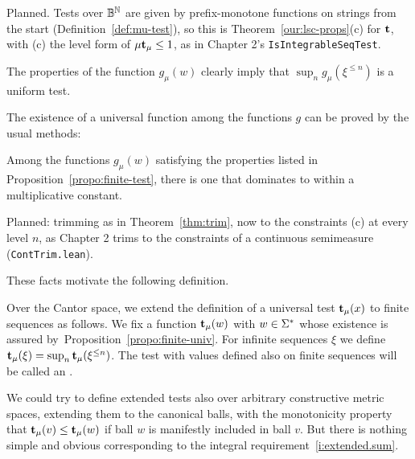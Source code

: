 \begin{formalization}
Planned. Tests over $\mathbb{B}^{\mathbb{N}}$ are given by prefix-monotone functions on strings from the start
(Definition~\ref{def:mu-test}), so this is Theorem~\ref{our:lsc-props}(c) for $\mathbf{t}$, with (c) the
level form of $\mu\mathbf{t}_{\mu}\le 1$, as in Chapter 2's \texttt{IsIntegrableSeqTest}.
\end{formalization}
The properties of the function \( g_{\mu}(w) \) clearly imply that 
\( \sup_{n} g_{\mu}(\xi^{\le n}) \) is a uniform test.

The existence of a universal function among the functions \( g \) can be proved by
the usual methods:

 \begin{proposition}\label{propo:finite-univ}
Among the functions \( g_{\mu}(w) \) satisfying the properties listed in
Proposition~\ref{propo:finite-test}, there is one that
dominates to within a multiplicative constant.
 \end{proposition}

\begin{formalization}
Planned: trimming as in Theorem~\ref{thm:trim}, now to the constraints (c) at every level $n$,
as Chapter 2 trims to the constraints of a continuous semimeasure (\texttt{ContTrim.lean}).
\end{formalization}

These facts motivate the following definition.

 \begin{definition}\label{def:extended-test}
Over the Cantor space, we
extend the definition of a universal test \( \mathbf{t}_{\mu}(x) \) to finite sequences
as follows.
We fix a function \( \mathbf{t}_{\mu}(w) \) with \( w\in\Sigma^{*} \)
whose existence is assured by~Proposition~\ref{propo:finite-univ}.
For infinite sequences \( \xi \) we define 
\( \mathbf{t}_{\mu}(\xi) = \sup_{n}\mathbf{t}_{\mu}(\xi^{\le n}) \).
The test with values defined also on finite sequences will be called an
.
 \end{definition}

We could try to define extended tests also over arbitrary constructive
metric spaces, extending them
to the canonical balls, with the monotonicity property that
\( \mathbf{t}_{\mu}(v)\le\mathbf{t}_{\mu}(w) \) if ball \( w \) is manifestly included in ball \( v \).
But there is nothing simple and obvious corresponding to the 
integral requirement~\eqref{i:extended.sum}.

